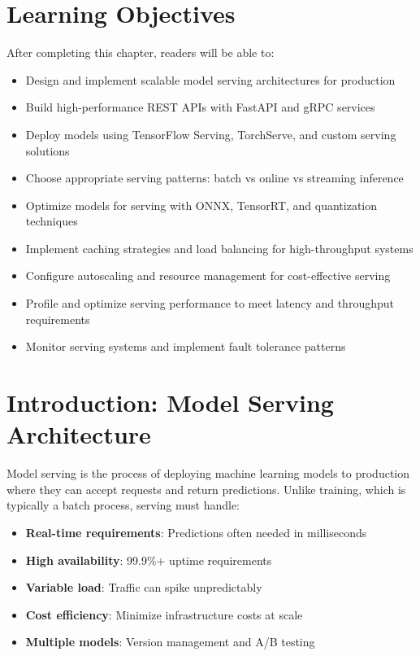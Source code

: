 \section{Learning Objectives}

After completing this chapter, readers will be able to:
\begin{itemize}
    \item Design and implement scalable model serving architectures for production
    \item Build high-performance REST APIs with FastAPI and gRPC services
    \item Deploy models using TensorFlow Serving, TorchServe, and custom serving solutions
    \item Choose appropriate serving patterns: batch vs online vs streaming inference
    \item Optimize models for serving with ONNX, TensorRT, and quantization techniques
    \item Implement caching strategies and load balancing for high-throughput systems
    \item Configure autoscaling and resource management for cost-effective serving
    \item Profile and optimize serving performance to meet latency and throughput requirements
    \item Monitor serving systems and implement fault tolerance patterns
\end{itemize}

\section{Introduction: Model Serving Architecture}

Model serving is the process of deploying machine learning models to production where they can accept requests and return predictions. Unlike training, which is typically a batch process, serving must handle:

\begin{itemize}
    \item \textbf{Real-time requirements}: Predictions often needed in milliseconds
    \item \textbf{High availability}: 99.9\%+ uptime requirements
    \item \textbf{Variable load}: Traffic can spike unpredictably
    \item \textbf{Cost efficiency}: Minimize infrastructure costs at scale
    \item \textbf{Multiple models}: Version management and A/B testing
\end{itemize}

